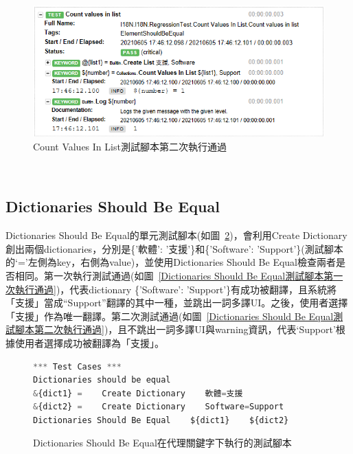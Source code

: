 \begin{figure}[H]
\includegraphics[width= \textwidth]{../論文截圖/4.1.2-3 count values in list 2nd run.png}
\caption{Count Values In List測試腳本第二次執行通過}
\label{Count Values In List測試腳本第二次執行通過}
\end{figure}

\hspace*{\fill} \\
\subsection{Dictionaries Should Be Equal}
Dictionaries Should Be Equal的單元測試腳本(如圖~\ref{Dictionaries Should Be Equal在代理關鍵字下執行的測試腳本})，會利用Create Dictionary創出兩個dictionaries，分別是\{'軟體': '支援'\}和\{'Software': 'Support'\}(測試腳本的‘=’左側為key，右側為value)，並使用Dictionaries Should Be Equal檢查兩者是否相同。第一次執行測試通過(如圖~\ref{Dictionaries Should Be Equal測試腳本第一次執行通過})，代表dictionary \{'Software': 'Support'\}有成功被翻譯，且系統將「支援」當成“Support”翻譯的其中一種，並跳出一詞多譯UI。之後，使用者選擇「支援」作為唯一翻譯。第二次測試通過(如圖~\ref{Dictionaries Should Be Equal測試腳本第二次執行通過})，且不跳出一詞多譯UI與warning資訊，代表‘Support’根據使用者選擇成功被翻譯為「支援」。
\hspace*{\fill} \\
\begin{figure}[H]
\begin{lstlisting}[language={python}]
*** Test Cases ***
Dictionaries should be equal
&{dict1} =    Create Dictionary    軟體=支援
&{dict2} =    Create Dictionary    Software=Support
Dictionaries Should Be Equal    ${dict1}    ${dict2}
\end{lstlisting}
\caption{Dictionaries Should Be Equal在代理關鍵字下執行的測試腳本}
\label{Dictionaries Should Be Equal在代理關鍵字下執行的測試腳本}
\end{figure}

